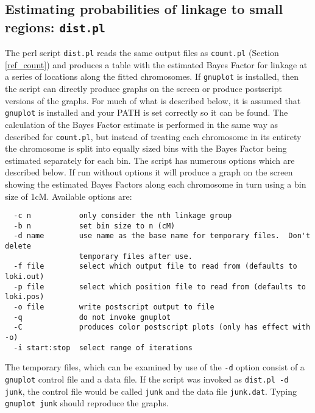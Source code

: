 \documentclass[10pt,a4paper]{article}
\begin{document}
\subsection{Estimating probabilities of linkage to small regions: \texttt{dist.pl}}
The perl script \verb+dist.pl+ reads the same output files as
\verb+count.pl+ (Section \ref{ref_count}) and produces a table with the
estimated Bayes Factor for linkage at a series of locations along the fitted
chromosomes.  If \verb+gnuplot+ is installed, then the script can directly produce
graphs on the screen or produce postscript versions of the graphs. For much
of what is described below, it is assumed that \verb+gnuplot+ is installed and your
PATH is set correctly so it can be found. The calculation of the Bayes
Factor estimate is performed in the same way as described for
\verb+count.pl+, but instead of treating each chromosome in its entirety
the chromosome is split into equally sized bins with the Bayes Factor being
estimated separately for each bin.  The script has numerous options which
are described below.  If run without options it will produce a graph on the
screen showing the estimated Bayes Factors along each chromosome in turn
using a bin size of 1cM.  Available options are:
\begin{verbatim}
  -c n           only consider the nth linkage group
  -b n           set bin size to n (cM)
  -d name        use name as the base name for temporary files.  Don't delete
                 temporary files after use.
  -f file        select which output file to read from (defaults to loki.out)
  -p file        select which position file to read from (defaults to loki.pos)
  -o file        write postscript output to file
  -q             do not invoke gnuplot
  -C             produces color postscript plots (only has effect with -o)
  -i start:stop  select range of iterations
\end{verbatim}
The temporary files, which can be examined by use of the \verb+-d+ option
consist of a \verb+gnuplot+ control file and a data file.  If the script was
invoked as \verb+dist.pl -d junk+, the control file would be called
\verb+junk+ and the data file \verb+junk.dat+.  Typing \verb+gnuplot junk+
should reproduce the graphs.
\end{document}
